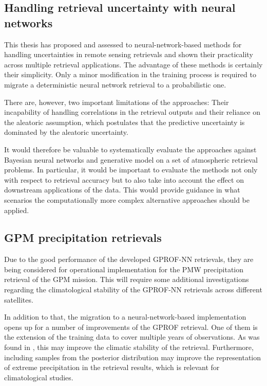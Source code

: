 \subsection{Handling retrieval uncertainty with neural networks}

This thesis has proposed and assessed to neural-network-based methods for
handling uncertainties in remote sensing retrievals and shown their practicality
across multiple retrieval applications. The advantage of these methods is
certainly their simplicity. Only a minor modification in the training process is
required to migrate a deterministic neural network retrieval to a probabilistic
one.

There are, however, two important limitations of the approaches: Their
incapability of handling correlations in the retrieval outputs and their
reliance on the aleatoric assumption, which postulates that the predictive
uncertainty is dominated by the aleatoric uncertainty.

It would therefore be valuable to systematically evaluate the approaches against
Bayesian neural networks and generative model on a set of atmospheric retrieval
problems. In particular, it would be important to evaluate the methods not only
with respect to retrieval accuracy but to also take into account the effect on
downstream applications of the data. This would provide guidance in what scenarios
the computationally more complex alternative approaches should be applied.

\subsection{GPM precipitation retrievals}

Due to the good performance of the developed GPROF-NN retrievals, they are being
considered for operational implementation for the PMW precipitation retrieval of
the GPM mission. This will require some additional investigations regarding the
climatological stability of the GPROF-NN retrievals across different satellites.

In addition to that, the migration to a neural-network-based implementation
opens up for a number of improvements of the GPROF retrieval. One of them is the
extension of the training data to cover multiple years of observations. As was
found in \citep{pfreundschuh22c}, this may improve the climatic stability of the
retrieval. Furthermore, including samples from the posterior distribution may
improve the representation of extreme precipitation in the retrieval results,
which is relevant for climatological studies.

